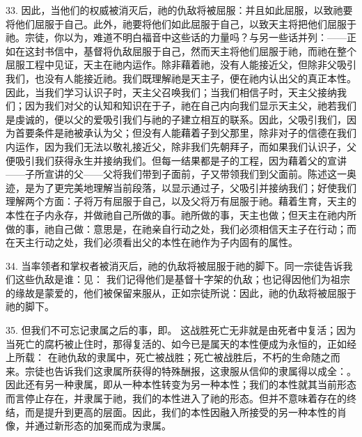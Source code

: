 33. 因此，当他们的权威被消灭后，祂的仇敌将被屈服：并且如此屈服，以致祂要将他们屈服于自己。此外，祂要将他们如此屈服于自己，以致天主将把他们屈服于祂。宗徒，你以为，难道不明白福音中这些话的力量吗？与另一些话并列：——正如在这封书信中，基督将仇敌屈服于自己，然而天主将他们屈服于祂，而祂在整个屈服工程中见证，天主在祂内运作。除非藉着祂，没有人能接近父，但除非父吸引我们，也没有人能接近祂。我们既理解祂是天主子，便在祂内认出父的真正本性。因此，当我们学习认识子时，天主父召唤我们；当我们相信子时，天主父接纳我们；因为我们对父的认知和知识在于子，祂在自己内向我们显示天主父，祂若我们是虔诚的，便以父的爱吸引我们与祂的子建立相互的联系。因此，父吸引我们，因为首要条件是祂被承认为父；但没有人能藉着子到父那里，除非对子的信德在我们内运作，因为我们无法以敬礼接近父，除非我们先朝拜子，而如果我们认识子，父便吸引我们获得永生并接纳我们。但每一结果都是子的工程，因为藉着父的宣讲——子所宣讲的父——父将我们带到子面前，子又带领我们到父面前。陈述这一奥迹，是为了更完美地理解当前段落，以显示通过子，父吸引并接纳我们；好使我们理解两个方面：子将万有屈服于自己，以及父将万有屈服于祂。藉着生育，天主的本性在子内永存，并做祂自己所做的事。祂所做的事，天主也做；但天主在祂内所做的事，祂自己做：意思是，在祂亲自行动之处，我们必须相信天主子在行动；而在天主行动之处，我们必须看出父的本性在祂作为子内固有的属性。\par

34. 当率领者和掌权者被消灭后，祂的仇敌将被屈服于祂的脚下。同一宗徒告诉我们这些仇敌是谁：见： 我们记得他们是基督十字架的仇敌；也记得因他们为祖宗的缘故是蒙爱的，他们被保留来服从，正如宗徒所说：因此，祂的仇敌将被屈服于祂的脚下。\par

35. 但我们不可忘记隶属之后的事，即。 这战胜死亡无非就是由死者中复活；因为当死亡的腐朽被止住时，那得复活的、如今已是属天的本性便成为永恒的，正如经上所载： 在祂仇敌的隶属中，死亡被战胜；死亡被战胜后，不朽的生命随之而来。宗徒也告诉我们这隶属所获得的特殊酬报，这隶服从信仰的隶属得以成全：。 因此还有另一种隶属，即从一种本性转变为另一种本性；我们的本性就其当前形态而言停止存在，并隶属于祂，我们的本性进入了祂的形态。但并不意味着存在的终结，而是提升到更高的层面。因此，我们的本性因融入所接受的另一种本性的肖像，并通过新形态的加冕而成为隶属。\par

